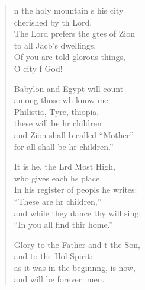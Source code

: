 \settowidth{\versewidth}{In his register of peoples he writes: *}
\begin{verse}%
  \begin{patverse}
n the holy mountain \pointup{\i}s his city\Med\\
cherished by th Lord.\\
The Lord prefers the gtes of Zion\Med\\
to all Jacb’s dwellings.\\
Of you are told glor\pointup{\i}ous things,\Med\\
O city f God!

Babylon and Egypt  will count\Med\\
among those wh know me;\\
Philistia, Tyre, thiopia,\Med\\
these will be hr children\\
and Zion shall b called “Mother”\Med\\
for all shall be hr children.”

It is he, the Lrd Most High,\Med\\
who gives each h\pointup{\i}s place.\\
In his register of peopls he writes:\Med\\
“These are hr children,”\\
and while they dance thy will sing:\Med\\
“In you all find thir home.”

Glory to the Father and t the Son,\Med\\
and to the Hol Spirit:\\
as it was in the beginn\pointup{\i}ng, is now,\Med\\
and will be forever. men.
  \end{patverse}
\end{verse}
